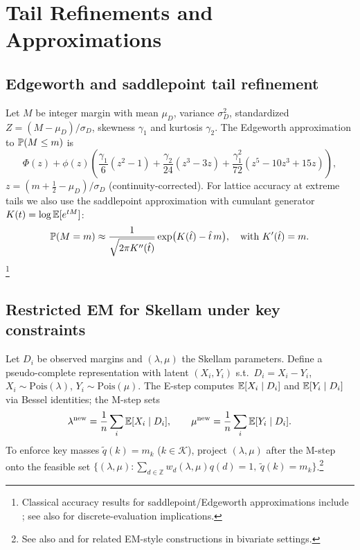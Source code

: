 \section{Tail Refinements and Approximations}
\subsection{Edgeworth and saddlepoint tail refinement}\label{subsec:edgeworth}
Let $M$ be integer margin with mean $\mu_D$, variance $\sigma_D^2$, standardized $Z=(M-\mu_D)/\sigma_D$,
skewness $\gamma_1$ and kurtosis $\gamma_2$. The Edgeworth approximation to $\mathbb{P}(M\le m)$ is
\[
\Phi(z)+\phi(z)\!\left(\frac{\gamma_1}{6}(z^2-1)+\frac{\gamma_2}{24}(z^3-3z)+\frac{\gamma_1^2}{72}(z^5-10z^3+15z)\right),
\]
$z=(m+\tfrac12-\mu_D)/\sigma_D$ (continuity-corrected). For lattice accuracy at extreme tails we also use
the saddlepoint approximation with cumulant generator $K(t)=\log \mathbb{E}[e^{tM}]$:
\[
\mathbb{P}(M=m)\approx \frac{1}{\sqrt{2\pi K''(\hat t)}}\exp\!\big(K(\hat t)-\hat t\,m\big),
\quad \text{with }K'(\hat t)=m.
\] \footnote{Classical accuracy results for saddlepoint/Edgeworth approximations include \citet{daniels1954}; see also  for discrete-evaluation implications.}

\subsection{Restricted EM for Skellam under key constraints}\label{subsec:skellam-em}
Let $D_i$ be observed margins and $(\lambda,\mu)$ the Skellam parameters. Define a pseudo-complete
representation with latent $(X_i,Y_i)$ s.t.\ $D_i=X_i-Y_i$, $X_i\sim\mathrm{Pois}(\lambda)$,
$Y_i\sim\mathrm{Pois}(\mu)$. The E-step computes $\mathbb{E}[X_i\mid D_i]$ and $\mathbb{E}[Y_i\mid D_i]$
via Bessel identities; the M-step sets
\[
\lambda^{\text{new}}=\frac{1}{n}\sum_i \mathbb{E}[X_i\mid D_i],\qquad
\mu^{\text{new}}=\frac{1}{n}\sum_i \mathbb{E}[Y_i\mid D_i].
\]
To enforce key masses $\tilde q(k)=m_k$ ($k\in\mathcal{K}$), project $(\lambda,\mu)$ after the M-step
onto the feasible set $\{(\lambda,\mu): \sum_{d\in\mathbb{Z}} w_d(\lambda,\mu)q(d)=1,\ \tilde q(k)=m_k\}$.\footnote{See also  and \citet{karlis2003} for related EM-style constructions in bivariate settings.}


